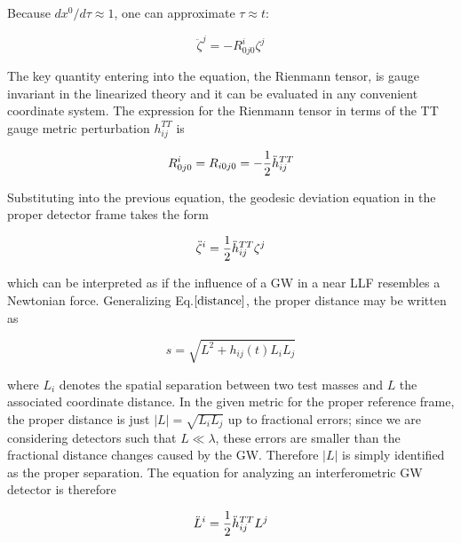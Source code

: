 \documentclass[binding=0.6cm, LaM]{sapthesis}
\begin{document}
	Because $dx^0/d\tau \approx 1$, one can approximate $\tau \approx t$:

		\begin{equation}
		{\ddot \zeta}^j = - R^i_{0j0}\zeta^j
		\end{equation}
	
	The key quantity entering into the equation, the Rienmann tensor, is gauge invariant in the linearized theory and  
	it can be evaluated in any convenient coordinate system.
	The expression for the Rienmann tensor in terms of the TT gauge metric perturbation $h_{ij}^{TT}$ is

		\begin{equation}
		R^i_{0j0} = R_{i0j0} = - {1 \over 2}{\ddot h}_{ij}^{TT}
		\end{equation}

	Substituting into the previous equation, the geodesic deviation equation in the proper detector frame takes the form

		\begin{equation}
		{\ddot \zeta}^i = {1 \over 2}{\ddot h}_{ij}^{TT}\zeta^j
		\end{equation}

	which can be interpreted as if the influence of a GW in a near LLF resembles a Newtonian force.
	Generalizing Eq.$\ref{distance}$, the proper distance may be written as 

		\begin{equation}
		s = \sqrt{L^2 + h_{ij}(t)L_{i}L_{j}}
		\end{equation}

	where $L_i$ denotes the spatial separation between two test masses and $L$ the associated coordinate distance.
	In the given metric for the proper reference frame, the proper distance is just $|L| = \sqrt{L_iL_j}$ up to fractional errors; 
	since we are considering detectors such that
	$L \ll \lambda$, these errors are smaller than the fractional distance changes caused by the GW.
	Therefore $|L|$ is simply identified as the proper separation. The equation for analyzing an interferometric GW detector is therefore

		\begin{equation}
		{\ddot L}^i = {1 \over 2}{\ddot h}_{ij}^{TT}L^j
		\end{equation}
\end{document}
